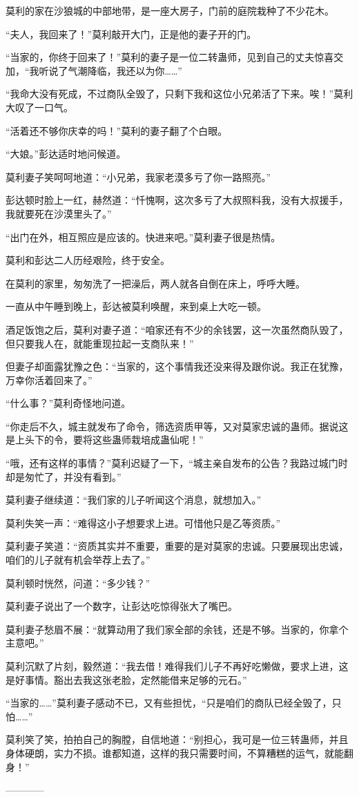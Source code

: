 \begin{this_body}
莫利的家在沙狼城的中部地带，是一座大房子，门前的庭院栽种了不少花木。

“夫人，我回来了！”莫利敲开大门，正是他的妻子开的门。

“当家的，你终于回来了！”莫利的妻子是一位二转蛊师，见到自己的丈夫惊喜交加，“我听说了气潮降临，我还以为你……”

“我命大没有死成，不过商队全毁了，只剩下我和这位小兄弟活了下来。唉！”莫利大叹了一口气。

“活着还不够你庆幸的吗！”莫利的妻子翻了个白眼。

“大娘。”彭达适时地问候道。

莫利妻子笑呵呵地道：“小兄弟，我家老漠多亏了你一路照亮。”

彭达顿时脸上一红，赫然道：“忏愧啊，这次多亏了大叔照料我，没有大叔援手，我就要死在沙漠里头了。”

“出门在外，相互照应是应该的。快进来吧。”莫利妻子很是热情。

莫利和彭达二人历经艰险，终于安全。

在莫利的家里，匆匆洗了一把澡后，两人就各自倒在床上，呼呼大睡。

一直从中午睡到晚上，彭达被莫利唤醒，来到桌上大吃一顿。

酒足饭饱之后，莫利对妻子道：“咱家还有不少的余钱罢，这一次虽然商队毁了，但只要我人在，就能重现拉起一支商队来！”

但妻子却面露犹豫之色：“当家的，这个事情我还没来得及跟你说。我正在犹豫，万幸你活着回来了。”

“什么事？”莫利奇怪地问道。

“你走后不久，城主就发布了命令，筛选资质甲等，又对莫家忠诚的蛊师。据说这是上头下的令，要将这些蛊师栽培成蛊仙呢！”

“哦，还有这样的事情？”莫利迟疑了一下，“城主亲自发布的公告？我路过城门时却是匆忙了，并没有看到。”

莫利妻子继续道：“我们家的儿子听闻这个消息，就想加入。”

莫利失笑一声：“难得这小子想要求上进。可惜他只是乙等资质。”

莫利妻子笑道：“资质其实并不重要，重要的是对莫家的忠诚。只要展现出忠诚，咱们的儿子就有机会举荐上去了。”

莫利顿时恍然，问道：“多少钱？”

莫利妻子说出了一个数字，让彭达吃惊得张大了嘴巴。

莫利妻子愁眉不展：“就算动用了我们家全部的余钱，还是不够。当家的，你拿个主意吧。”

莫利沉默了片刻，毅然道：“我去借！难得我们儿子不再好吃懒做，要求上进，这是好事情。豁出去我这张老脸，定然能借来足够的元石。”

“当家的……”莫利妻子感动不已，又有些担忧，“只是咱们的商队已经全毁了，只怕……”

莫利笑了笑，拍拍自己的胸膛，自信地道：“别担心，我可是一位三转蛊师，并且身体硬朗，实力不损。谁都知道，这样的我只需要时间，不算糟糕的运气，就能翻身！”

------------

\end{this_body}

